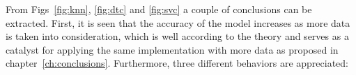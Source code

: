 
From Figs~\ref{fig:knn}, \ref{fig:dtc} and \ref{fig:svc} a couple of conclusions can be extracted. First, it is seen that the accuracy of the model increases as more data is taken into consideration, which is well according to the theory and serves as a catalyst for applying the same implementation with more data as proposed in chapter~\ref{ch:conclusions}. Furthermore, three different behaviors are appreciated:

